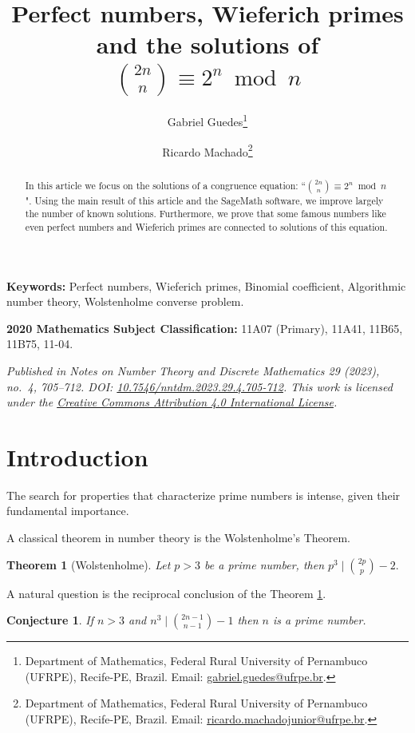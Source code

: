 \documentclass[11pt,a4paper]{article}
\title{Perfect numbers, Wieferich primes and the solutions of
\texorpdfstring{$\displaystyle\binom{2n}{n}\equiv 2^n \bmod n$}
{binomial (2n,n) congruent to 2^n modulo n}}
\author{
Gabriel Guedes\thanks{Department of Mathematics, Federal Rural University of Pernambuco (UFRPE), Recife-PE, Brazil. Email: \href{mailto:gabriel.guedes@ufrpe.br}{gabriel.guedes@ufrpe.br}.}
\and
Ricardo Machado\thanks{Department of Mathematics, Federal Rural University of Pernambuco (UFRPE), Recife-PE, Brazil. Email: \href{mailto:ricardo.machadojunior@ufrpe.br}{ricardo.machadojunior@ufrpe.br}.}
}
\date{}
\newtheorem{conjecture}{Conjecture}
\newtheorem{theorem}{Theorem}[section]
\begin{document}
\maketitle

\begin{abstract}
In this article we focus on the solutions of a congruence equation: ``$\binom{2n}{n}\equiv 2^n \bmod n$".
Using the main result of this article and the SageMath software, we improve largely the number of known solutions. Furthermore, we prove that some famous numbers like even perfect numbers and Wieferich primes are connected to solutions of this equation.
\end{abstract}

\noindent\textbf{Keywords:} Perfect numbers, Wieferich primes, Binomial coefficient, Algorithmic number theory, Wolstenholme converse problem.

\medskip
\noindent\textbf{2020 Mathematics Subject Classification:} 11A07 (Primary), 11A41, 11B65, 11B75, 11-04.

\medskip
\noindent\textit{Published in \emph{Notes on Number Theory and Discrete Mathematics} 29 (2023), no.~4, 705--712. DOI: \href{https://doi.org/10.7546/nntdm.2023.29.4.705-712}{10.7546/nntdm.2023.29.4.705-712}. This work is licensed under the \href{https://creativecommons.org/licenses/by/4.0/}{Creative Commons Attribution 4.0 International License}.}
\vspace{4mm}

\section{Introduction} \label{sec:Intr}

 The search for properties that characterize prime numbers is intense, given their fundamental importance. 

 A classical theorem in number theory is the Wolstenholme's Theorem.

\smallskip

\begin{theorem}[Wolstenholme]\label{Wolstenholme}
Let $p>3$ be a prime number, then $p^3\mid\binom{2p}{p}-2.$
\end{theorem}

\smallskip

A natural question is the reciprocal conclusion of the Theorem \ref{Wolstenholme}.

\smallskip

\begin{conjecture}\label{conj01}
If $n>3$ and $n^3\mid\binom{2n-1}{n-1}-1$ then $n$ is a prime number.
\end{conjecture}
\end{document}

